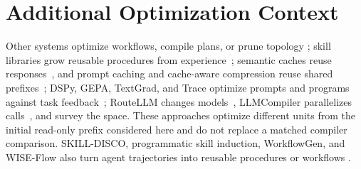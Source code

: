 \section{Additional Optimization Context}
\label{app:additional-related}
Other systems optimize workflows, compile
plans, or prune topology
\citep{abuzakuk2026awo,li2026flowcompile,chen2026agentslimming,wang2026covenant,chundru2026agenticcompilation};
skill libraries grow reusable procedures from
experience~\citep{wang2023voyager,zheng2025skillweaver}; semantic caches reuse
responses~\citep{bang2023gptcache}, and prompt caching and cache-aware
compression reuse shared prefixes~\citep{lumer2026cache,song2026capc};
DSPy, GEPA, TextGrad, and Trace optimize prompts and programs against task
feedback~\citep{khattab2024dspy,opsahlong2024mipro,agrawal2026gepa,yuksekgonul2024textgrad,cheng2024trace};
RouteLLM changes models~\citep{ong2025routellm}, LLMCompiler parallelizes
calls~\citep{kim2024llmcompiler}, and \citet{yue2026workflowsurvey} survey the
space.
These approaches optimize different units from the initial read-only prefix
considered here and do not replace a matched compiler comparison.
SKILL-DISCO, programmatic skill induction, WorkflowGen, and WISE-Flow also turn
agent trajectories into reusable procedures or workflows
\citep{guo2026skilldisco,shao2026nsi,wei2026workflowgen,zhou2026wiseflow}.

\begin{table}[!h]
  \centering
  \caption{Design properties of trace-reuse systems as stated in each paper.
  The comparison is of design, not of measured performance; no matched execution
  comparison with an external system is reported (\cref{app:compiler-funnel} runs
  the matched comparison within \method's own pipeline).}
  \label{tab:compiler-comparison}
  \scriptsize
  \setlength{\tabcolsep}{3pt}
  
\end{table}


